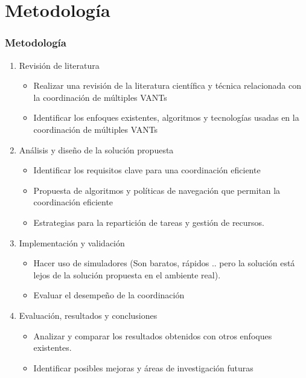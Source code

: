 \documentclass[
	11pt, %
]{beamer}
\begin{document}
\section{Metodología}

\begin{frame}

  \frametitle{Metodología}
  \bigskip %

  \begin{enumerate}
  \item <1-> Revisión de literatura 
    \begin{itemize}
    \item Realizar una revisión de la literatura científica y técnica relacionada con la coordinación de múltiples VANTs
    \item Identificar los enfoques existentes, algoritmos y tecnologías usadas en la coordinación de múltiples VANTs
    \end{itemize}
  \item <2-> Análisis y diseño de la solución propuesta
    \begin{itemize}
    \item Identificar los requisitos clave para una coordinación eficiente
    \item Propuesta de algoritmos y políticas de navegación que permitan la coordinación eficiente
    \item Estrategias para la repartición de tareas y gestión de recursos.
    \end{itemize}
  \item <3-> Implementación y validación
    \begin{itemize}
    \item Hacer uso de simuladores (Son baratos, rápidos .. pero la solución está lejos de la solución propuesta en el ambiente real).
    \item Evaluar el desempeño de la coordinación
    \end{itemize}
  \item <4-> Evaluación, resultados y conclusiones
    \begin{itemize}
    \item Analizar y comparar los resultados obtenidos con otros enfoques existentes.
    \item Identificar posibles mejoras y áreas de investigación futuras
    \end{itemize}
  \end{enumerate}
  
\end{frame}
\end{document}
